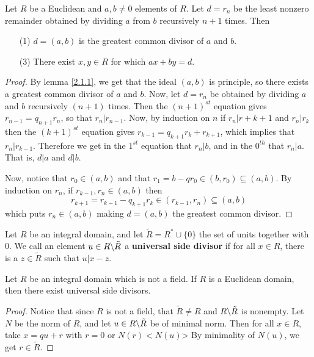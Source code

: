 \begin{theorem}\label{2.1.6}
    Let $R$ be a Euclidean and $a,b \neq 0$ elements of  $R$. Let  $d=r_n$ be
    the least nonzero remainder obtained by dividing $a$ from $b$ recursively
    $n+1$ times. Then
    \begin{enumerate}
        \item[(1)] $d=(a,b)$ is the greatest common divisor of $a$ and  $b$.

        \item[(3)] There exist $x,y \in R$ for which  $ax+by=d$.
    \end{enumerate}
\end{theorem}
\begin{proof}
    By lemma \ref{2.1.1}, we get that the ideal $(a,b)$ is principle, so there
    exists a greatest common divisor of $a$ and  $b$. Now, let  $d=r_n$ be
    obtained by dividing $a$ and $b$ recursively $(n+1)$ times. Then the
    $(n+1)^{st}$ equation gives $r_{n-1}=q_{n+1}r_n$, so that $r_n|r_{n-1}$.
    Now, by induction on $n$ if  $r_n|r+{k+1}$ and $r_n|r_k$ then the
    $(k+1)^{st}$ equation gives $r_{k-1}=q_{k+1}r_k+r_{k+1}$, which implies that
    $r_n|r_{k-1}$. Therefore we get in the $1^{st}$ equation that $r_n|b$, and in
    the $0^{th}$ that $r_n|a$. That is,  $d|a$ and  $d|b$.

    Now, notice that $r_0 \in (a,b)$ and that $r_1=b-qr_0 \in (b,r_0) \subseteq
    (a,b)$. By induction on $r_n$, if  $r_{k-1},r_n \in (a,b)$ then
    \begin{equation*}
        r_{k+1}=r_{k-1}-q_{k+1}r_k \in (r_{k-1},r_n) \subseteq (a,b)
    \end{equation*}
    which puts $r_n \in (a,b)$ making $d=(a,b)$ the greatest common divisor.
\end{proof}

\begin{definition}
    Let $R$ be an integral domain, and let
    $\tilde{R}=R^\ast \cup \{0\}$ the set of units together with $0$. We call
    an element  $u \in R \backslash \tilde{R}$ a \textbf{universal side divisor} if
    for all $x \in R$, there is a  $z \in \tilde{R}$ such that $u|x-z$.
\end{definition}

\begin{lemma}\label{2.1.7}
    Let $R$ be an integral domain which is not a field. If $R$ is a Euclidean
    domain, then there exist universal side divisors.
\end{lemma}
\begin{proof}
    Notice that since $R$ is not a field, that $\tilde{R} \neq R$ and
    $R \backslash \tilde{R}$ is nonempty. Let $N$ be the norm of  $R$, and let  $u
    \in R \backslash \tilde{R}$ be of minimal norm. Then for all $x \in R$, take
    $x=qu+r$ with  $r=0$ or  $N(r)<N(u)$> By minimality of $N(u)$, we get $r \in
    \tilde{R}$.
\end{proof}

